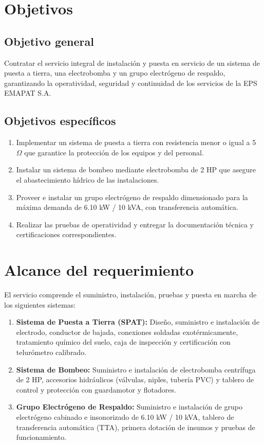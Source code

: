 \documentclass[12pt,a4paper]{article}
\begin{document}
\section{Objetivos}

\subsection{Objetivo general}

Contratar el servicio integral de instalación y puesta en servicio de un sistema de puesta a tierra, una electrobomba y un grupo electrógeno de respaldo, garantizando la operatividad, seguridad y continuidad de los servicios de la EPS EMAPAT S.A.

\subsection{Objetivos específicos}

\begin{enumerate}
  \item Implementar un sistema de puesta a tierra con resistencia menor o igual a 5 $\Omega$ que garantice la protección de los equipos y del personal.
  \item Instalar un sistema de bombeo mediante electrobomba de 2 HP que asegure el abastecimiento hídrico de las instalaciones.
  \item Proveer e instalar un grupo electrógeno de respaldo dimensionado para la máxima demanda de 6.10 kW / 10 kVA, con transferencia automática.
  \item Realizar las pruebas de operatividad y entregar la documentación técnica y certificaciones correspondientes.
\end{enumerate}

\section{Alcance del requerimiento}

El servicio comprende el suministro, instalación, pruebas y puesta en marcha de los siguientes sistemas:

\begin{enumerate}
  \item \textbf{Sistema de Puesta a Tierra (SPAT):} Diseño, suministro e instalación de electrodo, conductor de bajada, conexiones soldadas exotérmicamente, tratamiento químico del suelo, caja de inspección y certificación con telurómetro calibrado.
  \item \textbf{Sistema de Bombeo:} Suministro e instalación de electrobomba centrífuga de 2 HP, accesorios hidráulicos (válvulas, niples, tubería PVC) y tablero de control y protección con guardamotor y flotadores.
  \item \textbf{Grupo Electrógeno de Respaldo:} Suministro e instalación de grupo electrógeno cabinado e insonorizado de 6.10 kW / 10 kVA, tablero de transferencia automática (TTA), primera dotación de insumos y pruebas de funcionamiento.
\end{enumerate}
\end{document}
